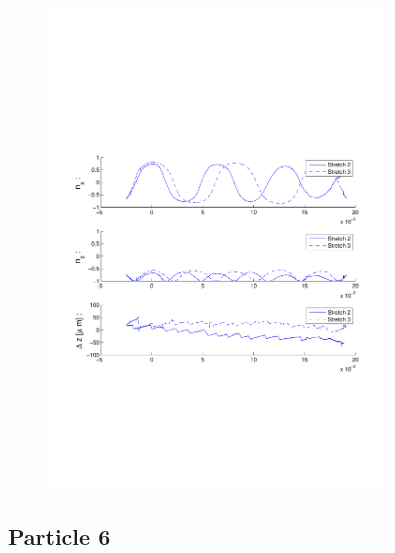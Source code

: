 \begin{figure}[H]

\centering

\includegraphics[width=0.8\textwidth]{Images/Particle 5/Stretch2.pdf}

\end{figure}


\subsection{Particle 6}

